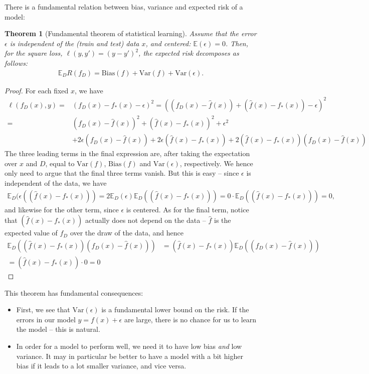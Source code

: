 \documentclass{article}
\newcommand{\erw}{\mathbb{E}} %
\newtheorem{theorem}{Theorem}
\begin{document}
There is a fundamental relation between bias, variance and expected risk of a model:
\begin{theorem}[Fundamental theorem of statistical learning] \label{th:fundamental}
    Assume that the error $\epsilon$ is independent of the (train and test) data $x$, and centered: $\erw(\epsilon)=0$. Then, for the square loss, $\ell(y,y')=(y-y')^2$, the expected risk decomposes as follows:
    \begin{align*}
        \erw_D R(f_D) = \mathrm{Bias}(f) + \mathrm{Var}(f) + \mathrm{Var}(\epsilon).
    \end{align*}
\end{theorem}
\begin{proof}
    For each fixed $x$, we have
    \begin{align*}
        \ell(f_D(x),y) =& (f_D(x)-f_*(x)-\epsilon)^2 = \left((f_D(x) - \widehat{f}(x)) + (\widehat{f}(x)-f_*(x)) -\epsilon\right)^2 \\
        =& (f_D(x)-\widehat{f}(x))^2 + (\widehat{f}(x)- f_*(x))^2 +\epsilon^2 \\
        & +2 \epsilon (f_D(x)-\widehat{f}(x)) + 2\epsilon (\widehat{f}(x)- f_*(x)) + 2(\widehat{f}(x)- f_*(x))(f_D(x)-\widehat{f}(x))
    \end{align*}
    The three leading terms in the final expression are, after taking the expectation over $x$ and $D$, equal to $\mathrm{Var}(f)$, $\mathrm{Bias}(f)$ and $\mathrm{Var}(\epsilon)$, respectively. We hence only need to argue that the final three terms vanish. But this is easy -- since $\epsilon$ is independent of the data, we have
    \begin{align*}
        \erw_D(\epsilon ((\widehat{f}(x)- f_*(x))) = 2\erw_D(\epsilon) \erw_D((\widehat{f}(x)- f_*(x))) = 0 \cdot  \erw_D((\widehat{f}(x)- f_*(x))) =0,
    \end{align*}
    and likewise for the other term, since $\epsilon$ is centered. As for the final term, notice that $(\widehat{f}(x)- f_*(x))$ actually does not depend on the data -- $\widehat{f}$ is the expected value of $f_D$ over the draw of the data, and hence
    \begin{align*}
        \erw_D((\widehat{f}(x)- f_*(x))(f_D(x)-\widehat{f}(x)))& = (\widehat{f}(x)- f_*(x))\erw_D((f_D(x)-\widehat{f}(x))) \\= (\widehat{f}(x)- f_*(x))\cdot 0 = 0 
    \end{align*}
\end{proof}
This theorem has fundamental consequences:
\begin{itemize}
    \item First, we see that $\mathrm{Var}(\epsilon)$ is a fundamental lower bound on the risk. If the errors in our model $y=f(x)+\epsilon$ are large, there is no chance for us to learn the model -- this is natural.
    \item In order for a model to perform well, we need it to have low bias \emph{and} low variance. It may in particular be better to have a model with a bit higher bias if it leads to a lot smaller variance, and vice versa. 
\end{itemize}
\end{document}
